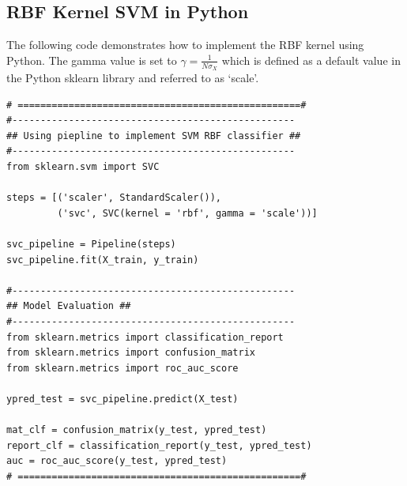 \subsection{RBF Kernel SVM in Python}
The following code demonstrates how to implement the RBF kernel using Python. The gamma value is set to $\gamma = \frac{1}{N\sigma_X}$ which is defined as a default value in the Python sklearn library and referred to as `scale'.
\begin{lstlisting}
# ==================================================#
#--------------------------------------------------
## Using piepline to implement SVM RBF classifier ##
#--------------------------------------------------
from sklearn.svm import SVC

steps = [('scaler', StandardScaler()),
         ('svc', SVC(kernel = 'rbf', gamma = 'scale'))]

svc_pipeline = Pipeline(steps)
svc_pipeline.fit(X_train, y_train)

#--------------------------------------------------
## Model Evaluation ##
#--------------------------------------------------
from sklearn.metrics import classification_report
from sklearn.metrics import confusion_matrix
from sklearn.metrics import roc_auc_score

ypred_test = svc_pipeline.predict(X_test)

mat_clf = confusion_matrix(y_test, ypred_test)
report_clf = classification_report(y_test, ypred_test)
auc = roc_auc_score(y_test, ypred_test)
# ==================================================#
\end{lstlisting}

%

